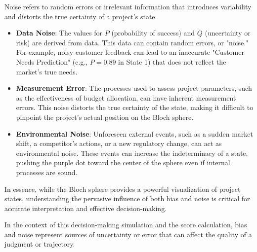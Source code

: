 \documentclass{article}
\begin{document}
Noise refers to random errors or irrelevant information that introduces variability and distorts the true certainty of a project's state.

\begin{itemize}
    \item \textbf{Data Noise}: The values for $P$ (probability of success) and $Q$ (uncertainty or risk) are derived from data. This data can contain random errors, or "noise." For example, noisy customer feedback can lead to an inaccurate "Customer Needs Prediction" (e.g., $P=0.89$ in State 1) that does not reflect the market's true needs.
    \item \textbf{Measurement Error}: The processes used to assess project parameters, such as the effectiveness of budget allocation, can have inherent measurement errors. This noise distorts the true certainty of the state, making it difficult to pinpoint the project's actual position on the Bloch sphere.
    \item \textbf{Environmental Noise}: Unforeseen external events, such as a sudden market shift, a competitor's actions, or a new regulatory change, can act as environmental noise. These events can increase the indeterminacy of a state, pushing the purple dot toward the center of the sphere even if internal processes are sound.
\end{itemize}

In essence, while the Bloch sphere provides a powerful visualization of project states, understanding the pervasive influence of both bias and noise is critical for accurate interpretation and effective decision-making.


In the context of this decision-making simulation and the score calculation, bias and noise represent sources of uncertainty or error that can affect the quality of a judgment or trajectory.
\end{document}
